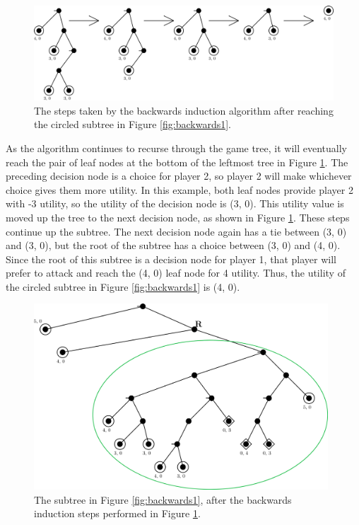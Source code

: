 \begin{figure}[H]
  \centering
  \includegraphics[width=12cm]{figures/Backwards2.png}
  \caption{The steps taken by the backwards induction algorithm after reaching the circled subtree in Figure \ref{fig:backwards1}.}
  \label{fig:backwards2}
\end{figure}
As the algorithm continues to recurse through the game tree, it will eventually reach the pair of leaf nodes at the bottom of the leftmost tree in Figure \ref{fig:backwards2}. The preceding decision node is a choice for player 2, so player 2 will make whichever choice gives them more utility. In this example, both leaf nodes provide player 2 with -3 utility, so the utility of the decision node is (3, 0). This utility value is moved up the tree to the next decision node, as shown in Figure \ref{fig:backwards2}. These steps continue up the subtree. The next decision node again has a tie between (3, 0) and (3, 0), but the root of the subtree has a choice between (3, 0) and (4, 0). Since the root of this subtree is a decision node for player 1, that player will prefer to attack and reach the (4, 0) leaf node for 4 utility. Thus, the utility of the circled subtree in Figure \ref{fig:backwards1} is (4, 0).\\

\begin{figure}[H]
  \centering
  \includegraphics[width=11cm]{figures/Backwards3.png}
  \caption{The subtree in Figure \ref{fig:backwards1}, after the backwards induction steps performed in Figure \ref{fig:backwards2}.}
  \label{fig:backwards3}
\end{figure}

